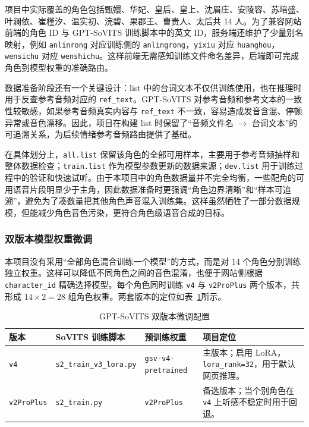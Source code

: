 \documentclass[12pt,a4paper]{article}
\begin{document}
项目中实际覆盖的角色包括甄嬛、华妃、皇后、皇上、沈眉庄、安陵容、苏培盛、叶澜依、崔槿汐、温实初、浣碧、果郡王、曹贵人、太后共 14 人。为了兼容网站前端的角色 ID 与 GPT-SoVITS 训练脚本中的英文 ID，服务端还维护了少量别名映射，例如 \texttt{anlinrong} 对应训练侧的 \texttt{anlingrong}，\texttt{yixiu} 对应 \texttt{huanghou}，\texttt{wensichu} 对应 \texttt{wenshichu}。这样前端无需感知训练文件命名差异，后端即可完成角色到模型权重的准确路由。

数据准备阶段还有一个关键设计：list 中的台词文本不仅供训练使用，也在推理时用于反查参考音频对应的 \texttt{ref\_text}。GPT-SoVITS 对参考音频和参考文本的一致性较敏感，如果参考音频真实内容与 \texttt{ref\_text} 不一致，容易造成发音含混、停顿异常或音色漂移。因此，项目在构建 list 时保留了“音频文件名 \(\to\) 台词文本”的可追溯关系，为后续情绪参考音频路由提供了基础。

在具体划分上，\texttt{all.list} 保留该角色的全部可用样本，主要用于参考音频抽样和整体数据检查；\texttt{train.list} 作为模型参数更新的数据来源；\texttt{dev.list} 用于训练过程中的验证和快速试听。由于本项目中的角色数据量并不完全均衡，一些配角的可用语音片段明显少于主角，因此数据准备时更强调“角色边界清晰”和“样本可追溯”，避免为了凑数量把其他角色声音混入训练集。这样虽然牺牲了一部分数据规模，但能减少角色音色污染，更符合角色级语音合成的目标。

\subsubsection{双版本模型权重微调}

本项目没有采用“全部角色混合训练一个模型”的方式，而是对 14 个角色分别训练独立权重。这样可以降低不同角色之间的音色混淆，也便于网站侧根据 \texttt{character\_id} 精确选择模型。每个角色同时训练 \texttt{v4} 与 \texttt{v2ProPlus} 两个版本，共形成 \(14 \times 2 = 28\) 组角色权重。两套版本的定位如表~\ref{tab:gptsovits-versions}所示。

\begin{table}[H]
\centering
\caption{GPT-SoVITS 双版本微调配置}
\label{tab:gptsovits-versions}
\begin{tabularx}{\textwidth}{p{2.7cm}p{3.8cm}p{3.4cm}X}
\toprule
\rowcolor{Bmid!18}
\textbf{版本} & \textbf{SoVITS 训练脚本} & \textbf{预训练权重} & \textbf{项目定位} \\
\midrule
\rowcolor{Blight}
\texttt{v4} & {\footnotesize\texttt{s2\_train\_v3\_lora.py}} & {\footnotesize\texttt{gsv-v4-pretrained}} & 主版本；启用 LoRA，\texttt{lora\_rank=32}，用于默认网页推理。 \\
\rowcolor{white}
\texttt{v2ProPlus} & {\footnotesize\texttt{s2\_train.py}} & \texttt{v2ProPlus} & 备选版本；当个别角色在 \texttt{v4} 上听感不稳定时用于回退。 \\
\bottomrule
\end{tabularx}
\end{table}
\end{document}
